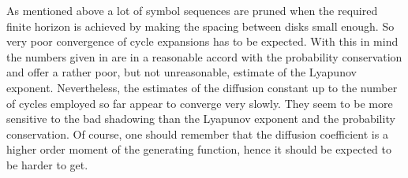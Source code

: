 {As mentioned above a lot of symbol sequences are pruned when
the required finite horizon is achieved by making the spacing between disks
small enough. So very poor
convergence of cycle expansions has to be expected. With this in mind the
numbers given in  are in a reasonable
accord with the probability conservation
and offer a rather poor, but not unreasonable, estimate of
the Lyapunov exponent.
Nevertheless, the estimates of the diffusion constant
up to the number of cycles employed so far appear to converge very
slowly. They seem to be more sensitive to the bad shadowing than the Lyapunov
exponent and the probability conservation. Of course, one should
remember that the diffusion coefficient is a higher order moment
of the generating function, hence it should be expected
to be harder to get.
%
%
%
%

}
